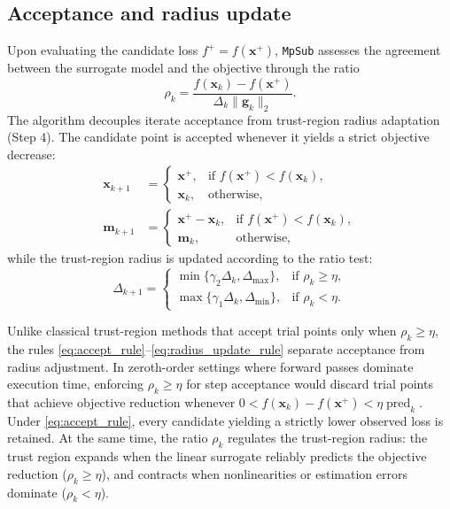 \documentclass[smallextended]{svjour3}
\newcommand{\bx}{\bm{x}}
\newcommand{\bg}{\bm{g}}
\begin{document}
\subsection{Acceptance and radius update}
\label{subsec:update}

Upon evaluating the candidate loss $f^+ = f(\bx^+)$, \texttt{MpSub} assesses the agreement between the surrogate model and the objective through the ratio
\begin{equation}
\rho_k = \frac{f(\bx_k) - f(\bx^+)}{\Delta_k \|\bg_k\|_2}.
\label{eq:agreement_ratio}
\end{equation}
The algorithm decouples iterate acceptance from trust-region radius adaptation (Step 4). The candidate point is accepted whenever it yields a strict objective decrease:
\begin{equation}
\begin{aligned}
\bx_{k+1} &=
\begin{cases}
\bx^+, & \text{if } f(\bx^+) < f(\bx_k), \\
\bx_k, & \text{otherwise},
\end{cases}
\\[4pt]
\bm m_{k+1} &=
\begin{cases}
\bx^+ - \bx_k, & \text{if } f(\bx^+) < f(\bx_k), \\
\bm m_k, & \text{otherwise},
\end{cases}
\end{aligned}
\label{eq:accept_rule}
\end{equation}
while the trust-region radius is updated according to the ratio test:
\begin{equation}
\Delta_{k+1} =
\begin{cases}
\min\{\gamma_2 \Delta_k, \Delta_{\max}\}, & \text{if } \rho_k \geq \eta, \\
\max\{\gamma_1 \Delta_k, \Delta_{\min}\}, & \text{if } \rho_k < \eta.
\end{cases}
\label{eq:radius_update_rule}
\end{equation}

Unlike classical trust-region methods \cite{conn2000trust} that accept trial points only when $\rho_k \ge \eta$, the rules \eqref{eq:accept_rule}--\eqref{eq:radius_update_rule} separate acceptance from radius adjustment. In zeroth-order settings where forward passes dominate execution time, enforcing $\rho_k \ge \eta$ for step acceptance would discard trial points that achieve objective reduction whenever $0 < f(\bx_k) - f(\bx^+) < \eta \operatorname{pred}_k$. Under \eqref{eq:accept_rule}, every candidate yielding a strictly lower observed loss is retained. At the same time, the ratio $\rho_k$ regulates the trust-region radius: the trust region expands when the linear surrogate reliably predicts the objective reduction ($\rho_k \ge \eta$), and contracts when nonlinearities or estimation errors dominate ($\rho_k < \eta$).
\end{document}

